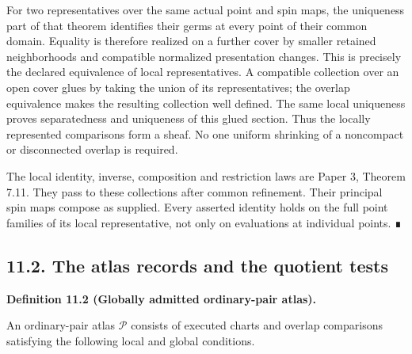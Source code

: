 \documentclass[
  english,
  11pt,
  reqno]{amsart}
\makeatletter
\newcommand{\paperdisplaynext}{%
  \let\paper@savedstartsection\@startsection
  \def\@startsection##1##2##3##4##5##6{%
    \let\@startsection\paper@savedstartsection
    \@tempskipa ##5\relax
    \ifdim\@tempskipa<\z@
      \def\paper@afterskip{.35\baselineskip}%
    \else
      \def\paper@afterskip{##5}%
    \fi
    \@startsection{##1}{##2}{##3}{##4}{\paper@afterskip}{##6}}}
\newcommand{\paperdisplaysection}{\paperdisplaynext\subsection}
\newcommand{\pandocstatementheading}[1]{%
  \par\if@nobreak\else
    \addpenalty{\@beginparpenalty}%
    \addvspace{.5\baselineskip plus .2\baselineskip minus .2\baselineskip}%
  \fi
  {\normalfont\bfseries #1\par}%
  \nobreak\@afterindenttrue\@afterheading
}
\makeatother
\begin{document}
For two representatives over the same actual point and spin maps, the
uniqueness part of that theorem identifies their germs at every point of
their common domain. Equality is therefore realized on a further cover
by smaller retained neighborhoods and compatible normalized presentation
changes. This is precisely the declared equivalence of local
representatives. A compatible collection over an open cover glues by
taking the union of its representatives; the overlap equivalence makes
the resulting collection well defined. The same local uniqueness proves
separatedness and uniqueness of this glued section. Thus the locally
represented comparisons form a sheaf. No one uniform shrinking of a
noncompact or disconnected overlap is required.

The local identity, inverse, composition and restriction laws are Paper
3, Theorem 7.11. They pass to these collections after common refinement.
Their principal spin maps compose as supplied. Every asserted identity
holds on the full point families of its local representative, not only
on evaluations at individual points. ∎

\protect{}\label{sec:ordinary-atlas-records}
\paperdisplaysection{11.2. The atlas records and the quotient
tests}\label{the-atlas-records-and-the-quotient-tests}
\pandocstatementheading{\protect{}\label{def:global-ordinary-pair-atlas}Definition 11.2 (Globally admitted ordinary-pair atlas).}

An ordinary-pair atlas \(\mathcal P\) consists of executed charts and
overlap comparisons satisfying the following local and global
conditions.
\end{document}
